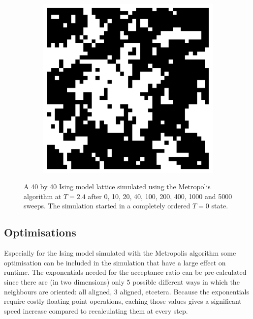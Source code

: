 \documentclass[11pt, a4paper]{report} %
\begin{document}
\begin{figure}[htb]
\begin{subfigure}[c]{0.2\linewidth}
	\end{subfigure}
	~
	\begin{subfigure}[c]{0.2\linewidth}
		\includegraphics[width=\linewidth]{20160603125722_40_by_40_Lattice_step5000.pdf}
	\end{subfigure}
	\caption{A 40 by 40 Ising model lattice simulated using the Metropolis algorithm at \(T=2.4\) after 0, 10, 20, 40, 100, 200, 400, 1000	and 5000 sweeps. The simulation started in a completely ordered \(T=0\) state.}
\end{figure}

\subsection{Optimisations}
Especially for the Ising model simulated with the Metropolis algorithm some optimisation can be included in the simulation that have a large effect on runtime.
The exponentials needed for the acceptance ratio can be pre-calculated since there are (in two dimensions) only 5 possible different ways in which the neighbours are oriented:
all aligned, 3 aligned, etcetera.
Because the exponentials require costly floating point operations, caching those values gives a significant speed increase compared to recalculating them at every step.
\end{document}

